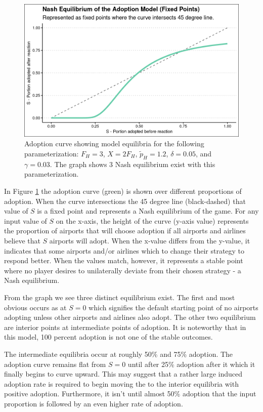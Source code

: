 \documentclass[a4paper, 14pt]{article}
\begin{document}
\begin{figure}
    \centering
    \includegraphics[width=0.7\linewidth]{adoption_curve_1.png}
    \caption{Adoption curve showing model equilibria for the following parameterization: $F_H=3$, $X=2F_H$, $\tilde{p}_H=1.2$, $\delta=0.05$, and $\gamma=0.03$. The graph shows 3 Nash equilibrium exist with this parameterization.}
    \label{fig:adopt_curve_1}
\end{figure}

In Figure \ref{fig:adopt_curve_1} the adoption curve (green) is shown over different proportions of adoption.
When the curve intersections the 45 degree line (black-dashed) that value of $S$ is a fixed point and represents a Nash equilibrium of the game.
For any input value of $S$ on the x-axis, the height of the curve (y-axis value) represents the proportion of airports that will choose adoption if all airports and airlines believe that $S$ airports will adopt. 
When the x-value differs from the y-value, it indicates that some airports and/or airlines which to change their strategy to respond better.
When the values match, however, it represents a stable point where no player desires to unilaterally deviate from their chosen strategy - a Nash equilibrium.

From the graph we see three distinct equilibrium exist.
The first and most obvious occurs as at $S = 0$ which signifies the default starting point of no airports adopting unless other airports and airlines also adopt.
The other two equilibrium are interior points at intermediate points of adoption.
It is noteworthy that in this model, 100 percent adoption is not one of the stable outcomes.

The intermediate equilibria occur at roughly 50\% and 75\% adoption.
The adoption curve remains flat from $S=0$ until after 25\% adoption after it which it finally begins to curve upward.
This may suggest that a rather large induced adoption rate is required to begin moving the to the interior equilibria with positive adoption.
Furthermore, it isn't until almost 50\% adoption that the input proportion is followed by an even higher rate of adoption.
\end{document}
